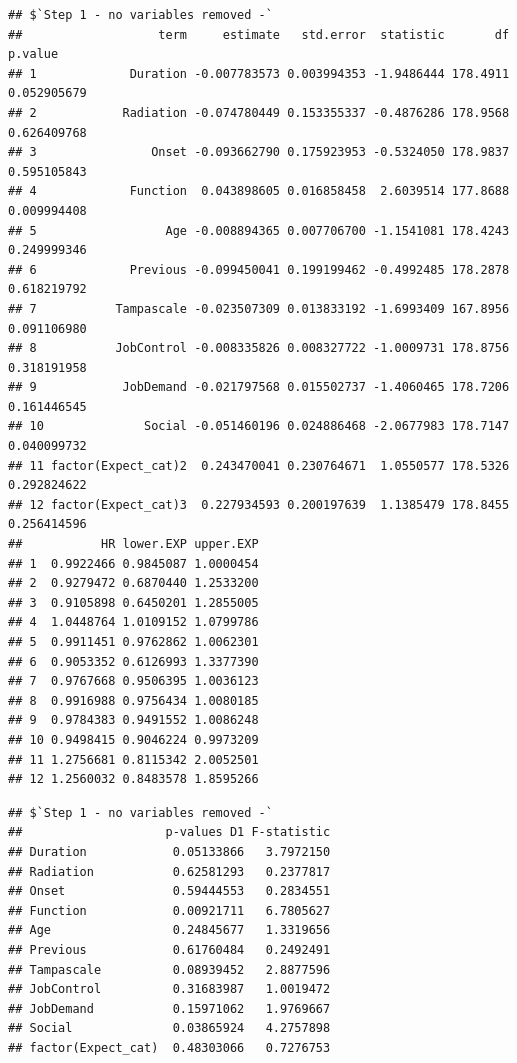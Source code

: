 \documentclass[
]{book}
\newenvironment{Shaded}{\begin{snugshade}}{\end{snugshade}}
\newcommand{\NormalTok}[1]{#1}
\newcommand{\OperatorTok}[1]{\textcolor[rgb]{0.81,0.36,0.00}{\textbf{#1}}}
\begin{document}
\begin{verbatim}
## $`Step 1 - no variables removed -`
##                   term     estimate   std.error  statistic       df     p.value
## 1             Duration -0.007783573 0.003994353 -1.9486444 178.4911 0.052905679
## 2            Radiation -0.074780449 0.153355337 -0.4876286 178.9568 0.626409768
## 3                Onset -0.093662790 0.175923953 -0.5324050 178.9837 0.595105843
## 4             Function  0.043898605 0.016858458  2.6039514 177.8688 0.009994408
## 5                  Age -0.008894365 0.007706700 -1.1541081 178.4243 0.249999346
## 6             Previous -0.099450041 0.199199462 -0.4992485 178.2878 0.618219792
## 7           Tampascale -0.023507309 0.013833192 -1.6993409 167.8956 0.091106980
## 8           JobControl -0.008335826 0.008327722 -1.0009731 178.8756 0.318191958
## 9            JobDemand -0.021797568 0.015502737 -1.4060465 178.7206 0.161446545
## 10              Social -0.051460196 0.024886468 -2.0677983 178.7147 0.040099732
## 11 factor(Expect_cat)2  0.243470041 0.230764671  1.0550577 178.5326 0.292824622
## 12 factor(Expect_cat)3  0.227934593 0.200197639  1.1385479 178.8455 0.256414596
##           HR lower.EXP upper.EXP
## 1  0.9922466 0.9845087 1.0000454
## 2  0.9279472 0.6870440 1.2533200
## 3  0.9105898 0.6450201 1.2855005
## 4  1.0448764 1.0109152 1.0799786
## 5  0.9911451 0.9762862 1.0062301
## 6  0.9053352 0.6126993 1.3377390
## 7  0.9767668 0.9506395 1.0036123
## 8  0.9916988 0.9756434 1.0080185
## 9  0.9784383 0.9491552 1.0086248
## 10 0.9498415 0.9046224 0.9973209
## 11 1.2756681 0.8115342 2.0052501
## 12 1.2560032 0.8483578 1.8595266
\end{verbatim}

\begin{Shaded}
\end{Shaded}

\begin{verbatim}
## $`Step 1 - no variables removed -`
##                    p-values D1 F-statistic
## Duration            0.05133866   3.7972150
## Radiation           0.62581293   0.2377817
## Onset               0.59444553   0.2834551
## Function            0.00921711   6.7805627
## Age                 0.24845677   1.3319656
## Previous            0.61760484   0.2492491
## Tampascale          0.08939452   2.8877596
## JobControl          0.31683987   1.0019472
## JobDemand           0.15971062   1.9769667
## Social              0.03865924   4.2757898
## factor(Expect_cat)  0.48303066   0.7276753
\end{verbatim}
\end{document}
